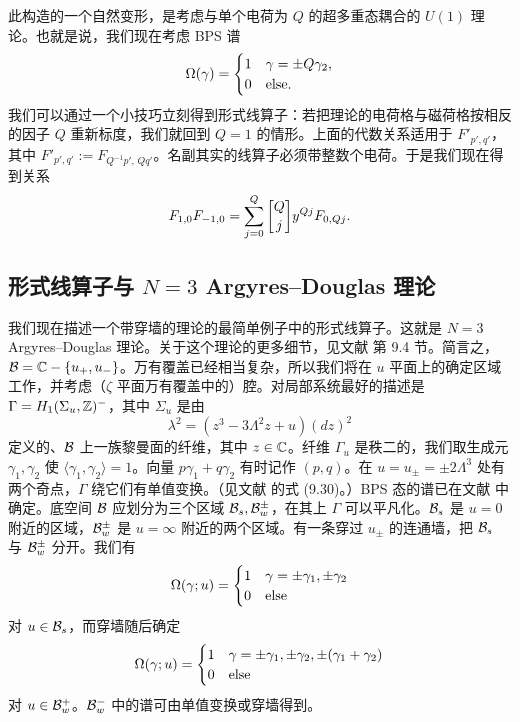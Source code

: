 此构造的一个自然变形，是考虑与单个电荷为 $Q$ 的超多重态耦合的 $U(1)$ 理论。也就是说，我们现在考虑 BPS 谱
\begin{equation}\label{eq:Q-BPS-spec}
\Omega(\gamma) = \begin{cases} 1 & \gamma = \pm Q\gamma_2, \\ 0 & {\rm else}. \end{cases}
\end{equation}
我们可以通过一个小技巧立刻得到形式线算子：若把理论的电荷格与磁荷格按相反的因子 $Q$ 重新标度，我们就回到 $Q=1$ 的情形。上面的代数关系适用于 $F'_{p',q'}$，其中 $F'_{p',q'} := F_{Q^{-1}p',\,Qq'}$。名副其实的线算子必须带整数个电荷。于是我们现在得到关系
\begin{equation}\label{eq:Q-U1-algebra}
F_{1,0}F_{-1,0} = \sum_{j=0}^Q \qbinom{Q}{j} y^{Qj} F_{0,Qj}.
\end{equation}

\subsection{形式线算子与 $N=3$ Argyres--Douglas 理论}\label{sec:formaln3}

我们现在描述一个带穿墙的理论的最简单例子中的形式线算子。这就是 $N=3$ Argyres--Douglas 理论。关于这个理论的更多细节，见文献 \cite{Gaiotto:2009hg} 第 9.4 节。简言之，$\mathcal{B} = \mathbb{C}-\{u_+,u_-\}$。万有覆盖已经相当复杂，所以我们将在 $u$ 平面上的确定区域工作，并考虑（$\zeta$ 平面万有覆盖中的）腔。对局部系统最好的描述是 $\Gamma = H_1(\Sigma_u,\mathbb{Z})^-$，其中 $\Sigma_u$ 是由
\begin{equation}
\lambda^2 = (z^3-3\Lambda^2 z+u)(dz)^2
\end{equation}
定义的、$\mathcal{B}$ 上一族黎曼面的纤维，其中 $z\in\mathbb{C}$。纤维 $\Gamma_u$ 是秩二的，我们取生成元 $\gamma_1,\gamma_2$ 使 $\langle\gamma_1,\gamma_2\rangle=1$。向量 $p\gamma_1+q\gamma_2$ 有时记作 $(p,q)$。在 $u=u_\pm=\pm 2\Lambda^3$ 处有两个奇点，$\Gamma$ 绕它们有单值变换。（见文献 \cite{Gaiotto:2009hg} 的式 (9.30)。）BPS 态的谱已在文献 \cite{Gaiotto:2009hg} 中确定。底空间 $\mathcal{B}$ 应划分为三个区域 $\mathcal{B}_s,\mathcal{B}_w^\pm$，在其上 $\Gamma$ 可以平凡化。$\mathcal{B}_s$ 是 $u=0$ 附近的区域，$\mathcal{B}_w^\pm$ 是 $u=\infty$ 附近的两个区域。有一条穿过 $u_\pm$ 的连通墙，把 $\mathcal{B}_s$ 与 $\mathcal{B}_w^\pm$ 分开。我们有
\begin{equation}
\Omega(\gamma;u) = \begin{cases} 1 & \gamma = \pm\gamma_1,\pm\gamma_2 \\ 0 & {\rm else} \end{cases}
\end{equation}
对 $u\in\mathcal{B}_s$，而穿墙随后确定
\begin{equation}
\Omega(\gamma;u) = \begin{cases} 1 & \gamma = \pm\gamma_1,\pm\gamma_2,\pm(\gamma_1+\gamma_2) \\ 0 & {\rm else} \end{cases}
\end{equation}
对 $u\in\mathcal{B}_w^+$。$\mathcal{B}_w^-$ 中的谱可由单值变换或穿墙得到。

